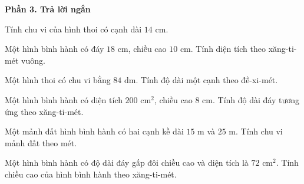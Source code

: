 \textbf{Phần 3. Trả lời ngắn}

\begin{ex} %
Tính chu vi của hình thoi có cạnh dài $14\text{ cm}$.
\end{ex}

\begin{ex} %
Một hình bình hành có đáy $18\text{ cm}$, chiều cao $10\text{ cm}$. Tính diện tích theo xăng-ti-mét vuông.
\end{ex}

\begin{ex} %
Một hình thoi có chu vi bằng $84\text{ dm}$. Tính độ dài một cạnh theo đề-xi-mét.
\end{ex}

\begin{ex} %
Một hình bình hành có diện tích $200\text{ cm}^2$, chiều cao $8\text{ cm}$. Tính độ dài đáy tương ứng theo xăng-ti-mét.
\end{ex}

\begin{ex} %
Một mảnh đất hình bình hành có hai cạnh kề dài $15\text{ m}$ và $25\text{ m}$. Tính chu vi mảnh đất theo mét.
\end{ex}

\begin{ex} %
Một hình bình hành có độ dài đáy gấp đôi chiều cao và diện tích là $72\text{ cm}^2$. Tính chiều cao của hình bình hành theo xăng-ti-mét.
\end{ex}
